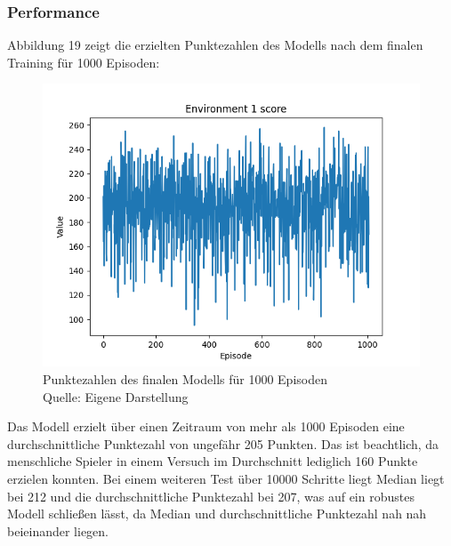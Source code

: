 \subsubsection{Performance}
Abbildung 19 zeigt die erzielten Punktezahlen des Modells nach dem finalen Training für 1000 Episoden:
\nopagebreak
\begin{figure}[H]
	\includegraphics[width=1\textwidth]{Bilder/maskableppo_ganzschoenclever_193avg_v3.1} 
	\caption[Punktezahlen des finalen Modells für 1000 Episoden]{Punktezahlen des finalen Modells für 1000 Episoden\\ Quelle: Eigene Darstellung}
\end{figure}

Das Modell erzielt über einen Zeitraum von mehr als 1000 Episoden eine durchschnittliche Punktezahl von ungefähr 205 Punkten. Das ist beachtlich, da menschliche Spieler in einem Versuch im Durchschnitt lediglich 160 Punkte erzielen konnten. Bei einem weiteren Test über 10000 Schritte liegt Median liegt bei 212 und die durchschnittliche Punktezahl bei 207, was auf ein robustes Modell schließen lässt, da Median und durchschnittliche Punktezahl nah nah beieinander liegen.\\

